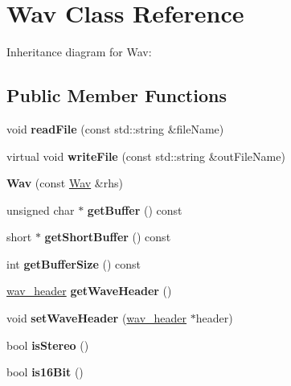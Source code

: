 \hypertarget{classWav}{}\section{Wav Class Reference}
\label{classWav}


Inheritance diagram for Wav\+:
\subsection*{Public Member Functions}
\begin{DoxyCompactItemize}
\item 
\mbox{\label{classWav_a1c4230cec49d30147a5b8a1950083f7c}} 
void {\bfseries read\+File} (const std\+::string \&file\+Name)
\item 
\mbox{\label{classWav_ad86f4a21d36719ae375ea2586f9f591f}} 
virtual void {\bfseries write\+File} (const std\+::string \&out\+File\+Name)
\item 
\mbox{\label{classWav_a8c11f0c7e8573a4c9180e5690ab2a354}} 
{\bfseries Wav} (const \hyperlink{classWav}{Wav} \&rhs)
\item 
\mbox{\label{classWav_aa713fc552ec8d011df0acede14d23295}} 
unsigned char $\ast$ {\bfseries get\+Buffer} () const
\item 
\mbox{\label{classWav_a24c23c9823a08c0ff1a2a39427b36135}} 
short $\ast$ {\bfseries get\+Short\+Buffer} () const
\item 
\mbox{\label{classWav_a71fdfa1d9f5e7c1b86f07bbff4249dca}} 
int {\bfseries get\+Buffer\+Size} () const
\item 
\mbox{\label{classWav_a7b640870f22bd813b1f211c9ef3139ec}} 
\hyperlink{structwav__header}{wav\+\_\+header} {\bfseries get\+Wave\+Header} ()
\item 
\mbox{\label{classWav_a8a36af8c9b2a3f6f6b80e640d15c67dc}} 
void {\bfseries set\+Wave\+Header} (\hyperlink{structwav__header}{wav\+\_\+header} $\ast$header)
\item 
\mbox{\label{classWav_ad933a085980a47031c91a91f9a3539ff}} 
bool {\bfseries is\+Stereo} ()
\item 
\mbox{\label{classWav_a476a9bed5c03843098b7ecf67d5afeaf}} 
bool {\bfseries is16\+Bit} ()
\end{DoxyCompactItemize}
